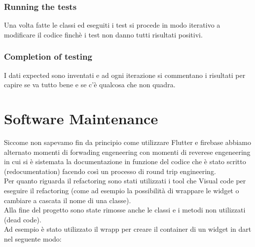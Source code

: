\documentclass{article}
\begin{document}
\subsubsection{Running the tests}
Una volta fatte le classi ed eseguiti i test si procede in modo iterativo a modificare il codice
finchè i test non danno tutti risultati positivi. 

\subsubsection{Completion of testing}
I dati expected sono inventati e ad ogni iterazione si commentano i risultati per capire 
se va tutto bene e se c'è qualcosa che non quadra.

\newpage
\section{Software Maintenance}
Siccome non sapevamo fin da principio come utilizzare Flutter e firebase abbiamo alternato momenti di forwading engeneering con momenti di reverese
engeneering in cui si è sistemata la documentazione in funzione del codice che è stato scritto (redocumentation) facendo così un processo
di round trip engineering.
\\Per quanto riguarda il refactoring sono stati utilizzati i tool che Visual code per eseguire il refactoring (come ad esempio 
la possibilità di wrappare le widget o cambiare a cascata il nome di una classe).
\\Alla fine del progetto sono state rimosse anche le classi e i metodi non utilizzati (dead code).
\\Ad esempio è stato utilizzato il wrapp per creare il container di un widget in dart nel seguente modo:
\end{document}
